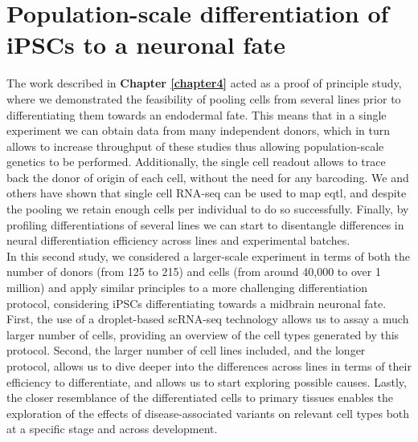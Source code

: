 
\chapter{Population-scale differentiation of iPSCs to a neuronal fate}
\label{chapter5}

The work described in \textbf{Chapter 
\ref{chapter4}}
acted as a proof of principle study, where we demonstrated the feasibility of pooling cells from several lines prior to differentiating them towards an endodermal fate.
This means that in a single experiment we can obtain data from many independent donors, which in turn allows to increase throughput of these studies thus allowing population-scale genetics to be performed.
Additionally, the single cell readout allows to trace back the donor of origin of each cell, without the need for any barcoding.
We and others have shown that single cell RNA-seq can be used to map \gls{eqtl}, and despite the pooling we retain enough cells per individual to do so successfully.
Finally, by profiling differentiations of several lines we can start to disentangle differences in neural differentiation efficiency across lines and experimental batches. \\

In this second study, we considered a larger-scale experiment in terms of both the number of donors (from 125 to 215) and cells (from around 40,000 to over 1 million) and apply similar principles to a more challenging differentiation protocol, considering iPSCs differentiating towards a midbrain neuronal fate.
First, the use of a droplet-based scRNA-seq technology allows us to assay a much larger number of cells, providing an overview of the 
cell types generated by this protocol. 
Second, the larger number of cell lines included, and the longer protocol, allows us to dive deeper into the differences across lines in terms of their efficiency to differentiate, and allows us to start exploring possible causes.
Lastly, the closer resemblance of the differentiated cells to primary tissues enables the exploration of the effects of disease-associated variants on relevant cell types both at a specific stage and across development. 

